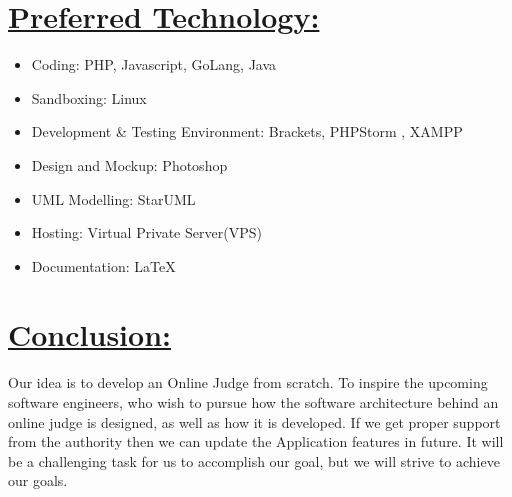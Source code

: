 \section*{\underline{Preferred Technology:}}
\begin{itemize}
  \item Coding: PHP, Javascript, GoLang, Java
  \item Sandboxing: Linux
  \item Development \& Testing Environment: Brackets, PHPStorm , XAMPP
  \item Design and Mockup: Photoshop
  \item UML Modelling: StarUML
  \item Hosting: Virtual Private Server(VPS)
  \item Documentation: \LaTeX
\end{itemize}


\section*{\underline{Conclusion:}}
Our idea is to develop an Online Judge from scratch. To inspire the upcoming software
engineers, who wish to pursue how the software architecture behind an online judge is designed,
as well as how it is developed. If we get proper support from the authority then we can update
the Application features in future. It will be a challenging task for us to accomplish our goal, but
we will strive to achieve our goals.
